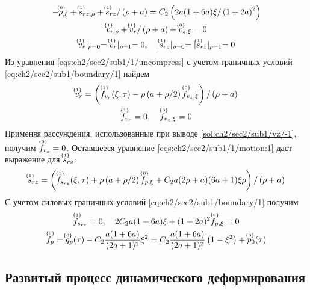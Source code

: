 \begin{subequations}
  \begin{gather}
    \label{eqs:ch2/sec2/sub1/1/motion:1}
    -\uindex{p}{0}_{,\xi} + \uindex{s}{1}_{rz,\rho} + \uindex{s}{1}_{rz} / \left(\rho+a\right) = C_2 \left(2a(1+6a)\xi/\left(1+2a\right)^2\right)
    \\
    \label{eqs:ch2/sec2/sub1/1/uncompress}
    \uindex{v}{1}_{r,\rho} + \uindex{v}{1}_{r} / \left(\rho+a\right) + \uindex{v}{0}_{z,\xi} = 0
    \\
    \label{eq:ch2/sec2/sub1/boundary/1}
    \uindex{v}{1}_{r}\lvert_{\rho=0} = \uindex{v}{1}_{r}\lvert_{\rho=1} = 0, \quad \lvert \uindex{s}{1}_{rz}\lvert_{\rho=0} = \lvert \uindex{s}{1}_{rz}\lvert_{\rho=1} = 0
  \end{gather}
\end{subequations}
Из уравнения \cref{eqs:ch2/sec2/sub1/1/uncompress} с учетом граничных условий \cref{eq:ch2/sec2/sub1/boundary/1} найдем
\begin{gather*}
  \uindex{v}{1}_{r} = \left(\uindex{f}{1}_{v_{r}}(\xi, \tau) -\rho \left(a+\rho/2\right) \uindex{f}{0}_{v_{z},\xi}\right) / \left(\rho+a\right)
  \\
  \uindex{f}{1}_{v_{r}} = 0, \quad \uindex{f}{0}_{v_{z},\xi}=0
\end{gather*}
Применяя рассуждения, использованные при выводе \cref{sol:ch2/sec2/sub1/vz/-1}, получим $\uindex{f}{0}_{v_{z}} = 0$. Оставшееся уравнение \cref{eqs:ch2/sec2/sub1/1/motion:1} даст выражение для $\uindex{s}{1}_{rz}$:
\begin{equation*}
  \uindex{s}{1}_{rz} = \left(\uindex{f}{1}_{s_{rz}}(\xi, \tau) + \rho \left(a+\rho/2\right) \uindex{f}{0}_{p,\xi} + C_2 a(2\rho+a)(6a+1)\xi\rho\right) / \left(\rho+a\right)
\end{equation*}
С учетом силовых граничных условий \cref{eq:ch2/sec2/sub1/boundary/1} получим
\begin{gather*}
  \uindex{f}{1}_{s_{rz}} = 0, \quad 2 C_2 a(1+6a)\xi + (1+2a)^2 \uindex{f}{0}_{p,\xi} = 0
  \\
  \uindex{f}{0}_{p} = \uindex{g}{0}_{p}(\tau) - C_2 \frac{a(1+6a)}{(2a+1)^2}\xi^2 = C_2 \frac{a(1+6a)}{(2a+1)^2}\left(1-\xi^2\right) + \uindex{p}{0}_{0}(\tau)
\end{gather*}
\subsection{Развитый процесс динамического деформирования}\label{subsec:ch2/sec2/sub2}

